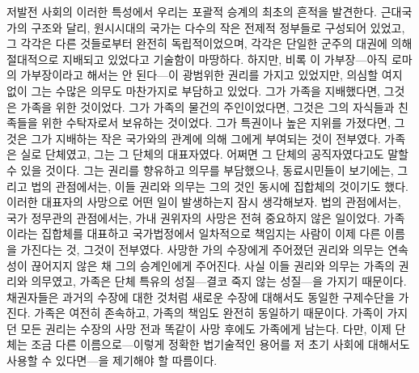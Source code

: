 저발전 사회의 이러한 특성에서 우리는 포괄적 승계의 최초의 흔적을 발견한다.
근대국가의 구조와 달리, 원시시대의 국가는
다수의 작은 전제적 정부들로 구성되어 있었고,
그 각각은 다른 것들로부터 완전히 독립적이었으며,
각각은 단일한 군주의 대권에 의해 절대적으로 지배되고 있었다고
기술함이 마땅하다.
하지만, 비록 이 가부장---아직 로마의 가부장이라고
해서는 안 된다---이 광범위한 권리를 가지고 있었지만,
의심할 여지 없이 그는 수많은 의무도 마찬가지로 부담하고 있었다.
그가 가족을 지배했다면, 그것은 가족을 위한 것이었다.
그가 가족의 물건의 주인이었다면, 그것은 그의 자식들과 친족들을 위한
수탁자로서 보유하는 것이었다.
그가 특권이나 높은 지위를 가졌다면, 그것은
그가 지배하는 작은 국가와의 관계에 의해 그에게 부여되는 것이 전부였다.
가족은 실로 단체였고, 그는 그 단체의 대표자였다.
어쩌면 그 단체의 공직자였다고도 말할 수 있을 것이다.
그는 권리를 향유하고 의무를 부담했으나,
동료시민들이 보기에는, 그리고 법의 관점에서는,
이들 권리와 의무는 그의 것인 동시에 집합체의 것이기도 했다.
이러한 대표자의 사망으로 어떤 일이 발생하는지 잠시 생각해보자.
법의 관점에서는, 국가 정무관의 관점에서는,
가내 권위자의 사망은 전혀 중요하지 않은 일이었다.
가족이라는 집합체를 대표하고 국가법정에서 일차적으로 책임지는 사람이
이제 다른 이름을 가진다는 것, 그것이 전부였다.
사망한 가의 수장에게 주어졌던 권리와 의무는
연속성이 끊어지지 않은 채 그의 승계인에게 주어진다.
사실 이들 권리와 의무는 가족의 권리와 의무였고,
가족은 단체 특유의 성질---결코 죽지 않는 성질---을 가지기 때문이다.
채권자들은 과거의 수장에 대한 것처럼
새로운 수장에 대해서도 동일한 구제수단을 가진다.
가족은 여전히 존속하고, 가족의 책임도 완전히 동일하기 때문이다.
가족이 가지던 모든 권리는 수장의 사망 전과 똑같이 사망 후에도
가족에게 남는다.
다만, 이제 단체는 조금 다른 이름으로---이렇게 정확한 법기술적인 용어를
저 초기 사회에 대해서도 사용할 수 있다면---을 제기해야 할
따름이다.

